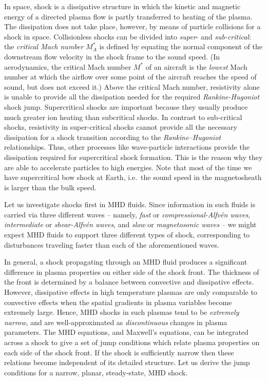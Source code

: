 \documentclass[
  notoc %
]{tufte-book}
\begin{document}
In space, shock is a dissipative structure in which the kinetic and
magnetic energy of a directed plasma flow is partly transferred to
heating of the plasma. The dissipation does not take place, however, by
means of particle collisions for a shock in space. Collisionless shocks
can be divided into \emph{super}- and \emph{sub-critical}: the
\emph{critical Mach number} \(M_A^\ast\) is defined by equating the
normal component of the downstream flow velocity in the shock frame to
the sound speed. (In aerodynamics, the critical Mach number \(M^\ast\)
of an aircraft is the \emph{lowest} Mach number at which the airflow
over some point of the aircraft reaches the speed of sound, but does not
exceed it.) Above the critical Mach number, resistivity alone is unable
to provide all the dissipation needed for the required
\emph{Rankine-Hugoniot} shock jump. Supercritical shocks are important
because they usually produce much greater ion heating than subcritical
shocks. In contrast to sub-critical shocks, resistivity in
super-critical shocks cannot provide all the necessary dissipation for a
shock transition according to the \emph{Rankine--Hugoniot}
relationships. Thus, other processes like wave-particle interactions
provide the dissipation required for supercritical shock formation. This
is the reason why they are able to accelerate particles to high
energies. Note that most of the time we have supercritical bow shock at
Earth, i.e.~the sound speed in the magnetosheath is larger than the bulk
speed.

Let us investigate shocks first in MHD fluids. Since information in such
fluids is carried via three different waves -- namely, \emph{fast} or
\emph{compressional-Alfvén waves}, \emph{intermediate} or
\emph{shear-Alfvén waves}, and \emph{slow} or \emph{magnetosonic waves}
-- we might expect MHD fluids to support three different types of shock,
corresponding to disturbances traveling faster than each of the
aforementioned waves.

In general, a shock propagating through an MHD fluid produces a
significant difference in plasma properties on either side of the shock
front. The thickness of the front is determined by a balance between
convective and dissipative effects. However, dissipative effects in high
temperature plasmas are only comparable to convective effects when the
spatial gradients in plasma variables become extremely large. Hence, MHD
shocks in such plasmas tend to be \emph{extremely narrow}, and are
well-approximated as \emph{discontinuous} changes in plasma parameters.
The MHD equations, and Maxwell's equations, can be integrated across a
shock to give a set of jump conditions which relate plasma properties on
each side of the shock front. If the shock is sufficiently narrow then
these relations become independent of its detailed structure. Let us
derive the jump conditions for a narrow, planar, steady-state, MHD
shock.
\end{document}
